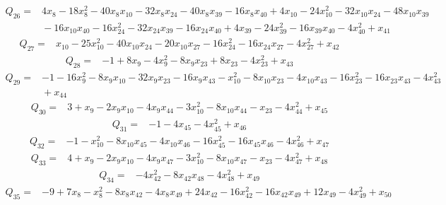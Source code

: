 \documentclass[11pt]{article}
\theoremstyle{definition}\newtheorem{definition}[theorem]{Definition}
\begin{document}
{%
\begin{align*}
 Q_{26}={}&4x_{8} -18x_{8}^{2} -40x_{8}x_{10} -32x_{8}x_{24} -40x_{8}x_{39} -16x_{8}x_{40} +4x_{10} -24x_{10}^{2} -32x_{10}x_{24} -48x_{10}x_{39}\\
 &{}-16x_{10}x_{40} -16x_{24}^{2} -32x_{24}x_{39} -16x_{24}x_{40} +4x_{39} -24x_{39}^{2} -16x_{39}x_{40} -4x_{40}^{2} +x_{41}
\end{align*}
\begin{align*}
 Q_{27}={}&x_{10} -25x_{10}^{2} -40x_{10}x_{24} -20x_{10}x_{27} -16x_{24}^{2} -16x_{24}x_{27} -4x_{27}^{2} +x_{42}
\end{align*}
\begin{align*}
 Q_{28}={}&-1 +8x_{9} -4x_{9}^{2} -8x_{9}x_{23} +8x_{23} -4x_{23}^{2} +x_{43}
\end{align*}
\begin{align*}
 Q_{29}={}&-1 -16x_{9}^{2} -8x_{9}x_{10} -32x_{9}x_{23} -16x_{9}x_{43} -x_{10}^{2} -8x_{10}x_{23} -4x_{10}x_{43} -16x_{23}^{2} -16x_{23}x_{43} -4x_{43}^{2}\\
 &{}+x_{44}
\end{align*}
\begin{align*}
 Q_{30}={}&3 +x_{9} -2x_{9}x_{10} -4x_{9}x_{44} -3x_{10}^{2} -8x_{10}x_{44} -x_{23} -4x_{44}^{2} +x_{45}
\end{align*}
\begin{align*}
 Q_{31}={}&-1 -4x_{45} -4x_{45}^{2} +x_{46}
\end{align*}
\begin{align*}
 Q_{32}={}&-1 -x_{10}^{2} -8x_{10}x_{45} -4x_{10}x_{46} -16x_{45}^{2} -16x_{45}x_{46} -4x_{46}^{2} +x_{47}
\end{align*}
\begin{align*}
 Q_{33}={}&4 +x_{9} -2x_{9}x_{10} -4x_{9}x_{47} -3x_{10}^{2} -8x_{10}x_{47} -x_{23} -4x_{47}^{2} +x_{48}
\end{align*}
\begin{align*}
 Q_{34}={}&-4x_{42}^{2} -8x_{42}x_{48} -4x_{48}^{2} +x_{49}
\end{align*}
\begin{align*}
 Q_{35}={}&-9 +7x_{8} -x_{8}^{2} -8x_{8}x_{42} -4x_{8}x_{49} +24x_{42} -16x_{42}^{2} -16x_{42}x_{49} +12x_{49} -4x_{49}^{2} +x_{50}

\end{align*}}
\end{document}

